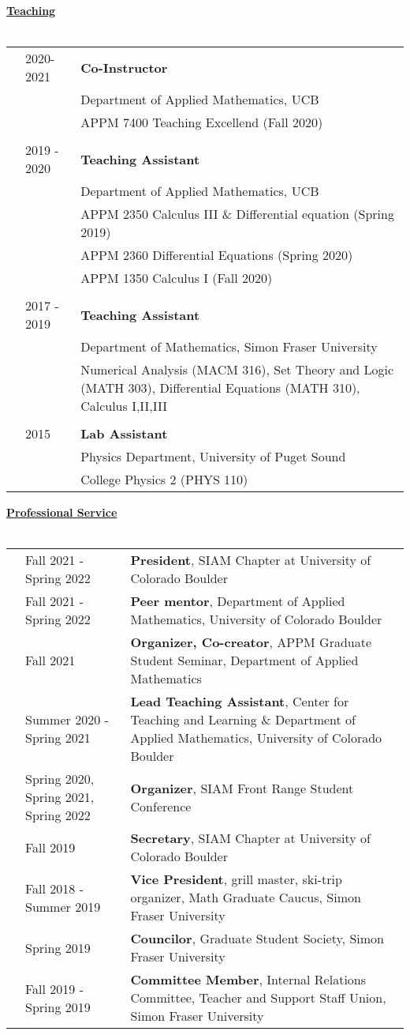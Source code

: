 \documentclass[letterpaper,11pt,oneside]{article}
\newcommand{\headr}[1]{\vspace{10pt}\uline{\Large{\textbf{#1}} \hfill } \\ \vspace{-10pt}\\}
\begin{document}
\headr{Teaching}

\begin{tabular}{@{} p{0.01cm} p{2cm} p{14cm}}
& 2020- 2021 & \textbf{Co-Instructor} \\
&		 & Department of Applied Mathematics, UCB \\
&     & APPM 7400 Teaching Excellend (Fall 2020)\\
&&\\
& 2019 - 2020 & \textbf{Teaching Assistant} \\
&		 & Department of Applied Mathematics, UCB \\
&     & APPM 2350 Calculus III \& Differential equation (Spring 2019)\\
&     & APPM 2360 Differential Equations (Spring 2020)\\
&     & APPM 1350 Calculus I (Fall 2020)\\
&&\\
& 2017 - 2019  & \textbf{Teaching Assistant} \\
&		 & Department of Mathematics, Simon Fraser University \\
&     & Numerical Analysis (MACM 316), Set Theory and Logic (MATH 303), Differential Equations (MATH 310), Calculus I,II,III\\
&&\\
& 2015  &\textbf{Lab Assistant} \\
&    &Physics Department, University of Puget Sound \\
&     & College Physics 2 (PHYS 110) \\
\end{tabular}

\headr{Professional Service}

\begin{tabular}{@{} p{0.01cm} p{4.5cm} p{12cm}}
& Fall 2021 - Spring 2022 & \textbf{President}, SIAM Chapter at University of Colorado Boulder\\
& Fall 2021 - Spring 2022  & \textbf{Peer mentor}, Department of Applied Mathematics, University of Colorado Boulder\\
& Fall 2021  & \textbf{Organizer, Co-creator}, APPM Graduate Student Seminar, Department of Applied Mathematics\\
& Summer 2020 - Spring 2021 & \textbf{Lead Teaching Assistant}, Center for Teaching and Learning \& Department of Applied Mathematics, University of Colorado Boulder\\
& Spring 2020, Spring 2021, Spring 2022  & \textbf{Organizer}, SIAM Front Range Student Conference \\
& Fall 2019  & \textbf{Secretary}, SIAM Chapter at University of Colorado Boulder\\
& Fall 2018 - Summer 2019 & \textbf{Vice President}, grill master, ski-trip organizer, Math Graduate Caucus, Simon Fraser University\\
& Spring 2019 & \textbf{Councilor}, Graduate Student Society, Simon Fraser University\\
& Fall 2019 - Spring 2019 & \textbf{Committee Member}, Internal Relations Committee, Teacher and Support Staff Union, Simon Fraser University \\
\end{tabular}
\end{document}
